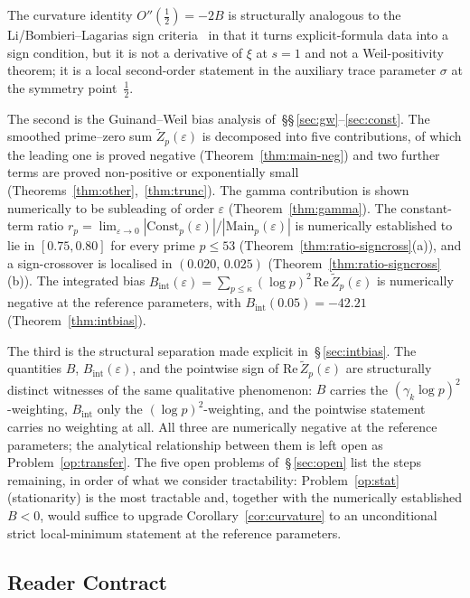 \documentclass[11pt]{article}
\newcommand{\Zt}{\widetilde{Z}}
\begin{document}
The curvature identity $O''(\tfrac12)=-2B$ is structurally analogous
to the Li/Bombieri--Lagarias sign
criteria~\cite{Li,BombieriLagarias} in that it turns
explicit-formula data into a sign condition, but it is not a
derivative of $\xi$ at $s=1$ and not a Weil-positivity theorem; it
is a local second-order statement in the auxiliary trace parameter
$\sigma$ at the symmetry point~$\tfrac12$.

The second is the Guinand--Weil bias analysis of~\S\S\,\ref{sec:gw}--\ref{sec:const}.
The smoothed prime--zero sum $\Zt_p(\varepsilon)$ is decomposed into
five contributions, of which the leading one is proved negative
(Theorem~\ref{thm:main-neg}) and two further terms are proved
non-positive or exponentially small
(Theorems~\ref{thm:other},~\ref{thm:trunc}).
The gamma contribution is shown numerically to be subleading of order
$\varepsilon$ (Theorem~\ref{thm:gamma}).
The constant-term ratio $r_p=\lim_{\varepsilon\to 0}
|\mathrm{Const}_p(\varepsilon)|/|\mathrm{Main}_p(\varepsilon)|$
is numerically established to lie in $[0.75,0.80]$ for every prime
$p\le 53$ (Theorem~\ref{thm:ratio-signcross}(a)), and a sign-crossover
is localised in $(0.020,\,0.025)$
(Theorem~\ref{thm:ratio-signcross}(b)).
The integrated bias
$B_{\mathrm{int}}(\varepsilon)=\sum_{p\le\kappa}(\log p)^2\,
\mathrm{Re}\,\Zt_p(\varepsilon)$ is numerically negative at the
reference parameters, with $B_{\mathrm{int}}(0.05)=-42.21$
(Theorem~\ref{thm:intbias}).

The third is the structural separation made explicit in~\S\,\ref{sec:intbias}.
The quantities $B$, $B_{\mathrm{int}}(\varepsilon)$, and the pointwise
sign of $\mathrm{Re}\,\Zt_p(\varepsilon)$ are structurally distinct
witnesses of the same qualitative phenomenon: $B$ carries the
$(\gamma_k\log p)^2$-weighting, $B_{\mathrm{int}}$ only the
$(\log p)^2$-weighting, and the pointwise statement carries no
weighting at all.
All three are numerically negative at the reference parameters; the
analytical relationship between them is left open as
Problem~\ref{op:transfer}.
The five open problems of~\S\,\ref{sec:open} list the steps remaining,
in order of what we consider tractability:
Problem~\ref{op:stat} (stationarity) is the most tractable and, together
with the numerically established $B<0$, would suffice to upgrade
Corollary~\ref{cor:curvature} to an unconditional strict local-minimum
statement at the reference parameters.

\subsection{Reader Contract}
\end{document}
